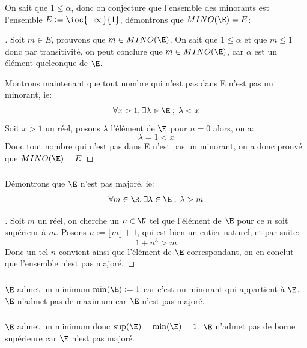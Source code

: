 \subsubsection*{}
On sait que \(1 \leq \alpha\), donc on conjecture que l'ensemble des minorants est l'ensemble \(E := \ioc{-\infty}{1}\), démontrons que \(MINO(\E) = E\):
\begin{proof}[\unskip\nopunct]
   Soit \(m \in E\), prouvons que \(m \in MINO(\E)\). On sait que \(1 \leq \alpha\) et que \(m \leq 1\) donc par transitivité, on peut conclure que \(m \in MINO(\E)\), car \(\alpha\) est un élément quelconque de \(\E\).\<
   
   Montrons maintenant que tout nombre qui n'est pas dans E n'est pas un minorant, ie:
   \[
      \forall x > 1, \exists \lambda \in \E \; ; \; \lambda < x
   \]
   Soit \(x > 1\) un réel, posons \(\lambda\) l'élément de \(\E\) pour \(n = 0\) alors, on a:
   \[
      \lambda = 1 < x 
   \]
   Donc tout nombre qui n'est pas dans E n'est pas un minorant, on a donc prouvé que \(MINO(\E) = E\)
\end{proof}

\subsubsection*{}
Démontrons que \(\E\) n'est pas majoré, ie:
\[
   \forall m \in \R, \exists \lambda \in \E \; ; \; \lambda > m   
\]
\begin{proof}[\unskip\nopunct]
   Soit \(m\) un réel, on cherche un \(n \in \N\) tel que l'élément de \(\E\) pour ce \(n\) soit supérieur à \(m\). Posons \(n:= \lfloor m \rfloor + 1\), qui est bien un entier naturel, et par suite:
   \[
      1 + n^3 > m
   \]
   Donc un tel \(n\) convient ainsi que l'élément de \(\E\) correspondant, on en conclut que l'ensemble n'est pas majoré. 
\end{proof}

\subsubsection*{}
\(\E\) admet un minimum \(\min(\E) := 1\) car c'est un minorant qui appartient à \(\E\).\+
\(\E\) n'admet pas de maximum car \(\E\) n'est pas majoré.

\subsubsection*{}
\(\E\) admet un minimum donc \(\sup(\E) = \min(\E) = 1\).\+
\(\E\) n'admet pas de borne supérieure car \(\E\) n'est pas majoré.
\pagebreak




